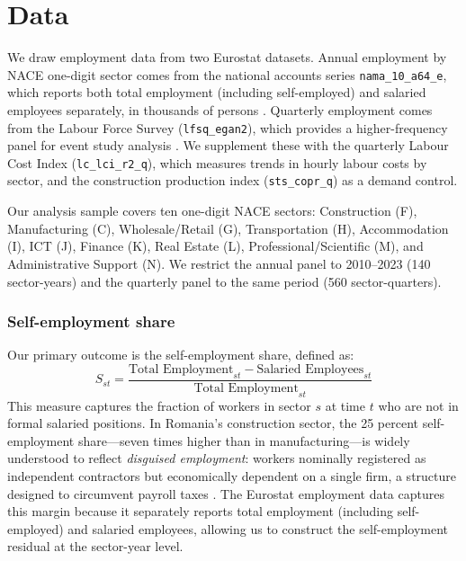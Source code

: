 \documentclass[12pt]{article}
\begin{document}
\section{Data}
\label{sec:data}

We draw employment data from two Eurostat datasets. Annual employment by NACE one-digit sector comes from the national accounts series \texttt{nama\_10\_a64\_e}, which reports both total employment (including self-employed) and salaried employees separately, in thousands of persons \citep{eurostat2023nama}. Quarterly employment comes from the Labour Force Survey (\texttt{lfsq\_egan2}), which provides a higher-frequency panel for event study analysis \citep{eurostat2024lfs}. We supplement these with the quarterly Labour Cost Index (\texttt{lc\_lci\_r2\_q}), which measures trends in hourly labour costs by sector, and the construction production index (\texttt{sts\_copr\_q}) as a demand control.

Our analysis sample covers ten one-digit NACE sectors: Construction (F), Manufacturing (C), Wholesale/Retail (G), Transportation (H), Accommodation (I), ICT (J), Finance (K), Real Estate (L), Professional/Scientific (M), and Administrative Support (N). We restrict the annual panel to 2010--2023 (140 sector-years) and the quarterly panel to the same period (560 sector-quarters).

\subsubsection*{Self-employment share} Our primary outcome is the self-employment share, defined as:
\begin{equation}
S_{st} = \frac{\text{Total Employment}_{st} - \text{Salaried Employees}_{st}}{\text{Total Employment}_{st}}
\end{equation}
This measure captures the fraction of workers in sector $s$ at time $t$ who are not in formal salaried positions. In Romania's construction sector, the 25 percent self-employment share---seven times higher than in manufacturing---is widely understood to reflect \textit{disguised employment}: workers nominally registered as independent contractors but economically dependent on a single firm, a structure designed to circumvent payroll taxes \citep{schneider2010new}. The Eurostat employment data captures this margin because it separately reports total employment (including self-employed) and salaried employees, allowing us to construct the self-employment residual at the sector-year level.
\end{document}

